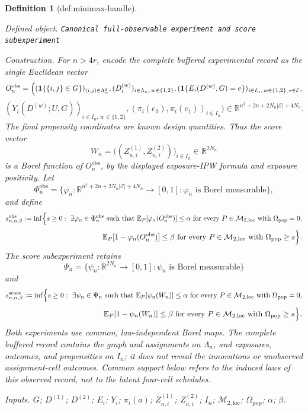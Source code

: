 \documentclass{article}
\newtheorem{definition}{Definition}
\begin{document}
\begin{definition}[def:minimax-handle]\label{def:minimax-handle}
\par\smallskip\noindent\emph{Defined object.} \texttt{Canonical full-\allowbreak{}observable experiment and score subexperiment}
\par\smallskip\noindent\emph{Construction.} For \(n>4r\), encode the complete buffered experimental record as the single Euclidean vector
\[
 O_n^{\mathrm{obs}}
 =\Bigl(
   (\mathbf 1\{\{i,j\}\in G\})_{(i,j)\in\Lambda_n^2},
   (D_i^{(w)})_{i\in\Lambda_n,\,w\in\{1,2\}},
   (\mathbf 1\{E_i(D^{(w)},G)=e\})_{i\in I_n,\,w\in\{1,2\},\,e\in\mathcal E},
\]
\[
   (Y_i(D^{(w)};U,G))_{i\in I_n,\,w\in\{1,2\}},
   (\pi_i(e_0),\pi_i(e_1))_{i\in I_n}
 \Bigr)
 \in\mathbb R^{n^2+2n+2N_n|\mathcal E|+4N_n}.
\]
The final propensity coordinates are known design quantities.  Thus the score vector
\[
 W_n=\bigl((Z_{n,i}^{(1)},Z_{n,i}^{(2)})\bigr)_{i\in I_n}
 \in\mathbb R^{2N_n}
\]
is a Borel function of \(O_n^{\mathrm{obs}}\), by the displayed exposure-IPW formula and exposure positivity.  Let
\[
 \Phi_n^{\mathrm{obs}}
 =\{\varphi_n:\mathbb R^{n^2+2n+2N_n|\mathcal E|+4N_n}\to[0,1]:
 \varphi_n\text{ is Borel measurable}\},
\]
and define
\[
 s_{n,\alpha,\beta}^{\mathrm{obs}}
 :=\inf\Bigl\{s\ge0:\ \exists\varphi_n\in\Phi_n^{\mathrm{obs}}\text{ such that }
 \mathbb E_P[\varphi_n(O_n^{\mathrm{obs}})]\le\alpha
 \text{ for every }P\in\mathcal M_{2,\mathrm{loc}}\text{ with }\Omega_{\mathrm{pop}}=0,
\]
\[
 \hspace{45mm}
 \mathbb E_P[1-\varphi_n(O_n^{\mathrm{obs}})]\le\beta
 \text{ for every }P\in\mathcal M_{2,\mathrm{loc}}\text{ with }\Omega_{\mathrm{pop}}\ge s\Bigr\}.
\]
The score subexperiment retains
\[
 \Psi_n=\{\psi_n:\mathbb R^{2N_n}\to[0,1]:\psi_n\text{ is Borel measurable}\}
\]
and
\[
 s_{n,\alpha,\beta}^{\mathrm{score}}
 :=\inf\Bigl\{s\ge0:\ \exists\psi_n\in\Psi_n\text{ such that }
 \mathbb E_P[\psi_n(W_n)]\le\alpha
 \text{ for every }P\in\mathcal M_{2,\mathrm{loc}}\text{ with }\Omega_{\mathrm{pop}}=0,
\]
\[
 \hspace{45mm}
 \mathbb E_P[1-\psi_n(W_n)]\le\beta
 \text{ for every }P\in\mathcal M_{2,\mathrm{loc}}\text{ with }\Omega_{\mathrm{pop}}\ge s\Bigr\}.
\]
Both experiments use common, law-independent Borel maps.  The complete buffered record contains the graph and assignments on \(\Lambda_n\), and exposures, outcomes, and propensities on \(I_n\); it does not reveal the innovations or unobserved assignment-cell outcomes. Common support below refers to the induced laws of this observed record, not to the latent four-cell schedules.
\par\smallskip\noindent\emph{Inputs.} \(G\); \(D^{(1)}\); \(D^{(2)}\); \(E_i\); \(Y_i\); \(\pi_i(a)\); \(Z_{n,i}^{(1)}\); \(Z_{n,i}^{(2)}\); \(I_n\); \(\mathcal M_{2,\mathrm{loc}}\); \(\Omega_{\mathrm{pop}}\); \(\alpha\); \(\beta\).
\end{definition}
\end{document}
